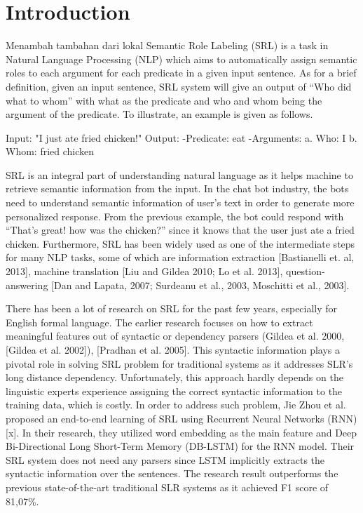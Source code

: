 \section{Introduction}
Menambah tambahan dari lokal
Semantic Role Labeling (SRL) is a task in Natural Language Processing (NLP) which aims to automatically assign semantic roles to each argument for each predicate in a given input sentence. As for a brief definition, given an input sentence, SRL system will give an output of “Who did what to whom” with what as the predicate and who and whom being the argument of the predicate. To illustrate, an example is given as follows.

Input: "I just ate fried chicken!"
Output:
-Predicate: eat
-Arguments:
a. Who: I
b. Whom: fried chicken

SRL is an integral part of understanding natural language as it helps machine to retrieve semantic information from the input. In the chat bot industry, the bots need to understand semantic information of user’s text in order to generate more personalized response. From the previous example, the bot could respond with “That’s great! how was the chicken?” since it knows that the user just ate a fried chicken. Furthermore, SRL has been widely used as one of the intermediate steps for many NLP tasks, some of which are information extraction [Bastianelli et. al, 2013], machine translation [Liu and Gildea 2010; Lo et al. 2013], question-answering [Dan and Lapata, 2007; Surdeanu et al., 2003, Moschitti et al., 2003].

There has been a lot of research on SRL for the past few years, especially for English formal language. The earlier research focuses on how to extract meaningful features out of syntactic or dependency parsers (Gildea et al. 2000, [Gildea et al. 2002]), [Pradhan et al. 2005].  This syntactic information plays a pivotal role in solving SRL problem for traditional systems as it addresses SLR’s long distance dependency. Unfortunately, this approach hardly depends on the linguistic experts experience assigning the correct syntactic information to the training data, which is costly. In order to address such problem, Jie Zhou et al. proposed an end-to-end learning of SRL using Recurrent Neural Networks (RNN) [x]. In their research, they utilized word embedding as the main feature and Deep Bi-Directional Long Short-Term Memory (DB-LSTM) for the RNN model. Their SRL system does not need any parsers since LSTM implicitly extracts the syntactic information over the sentences. The research result outperforms the previous state-of-the-art traditional SLR systems as it achieved F1 score of 81,07\%.

